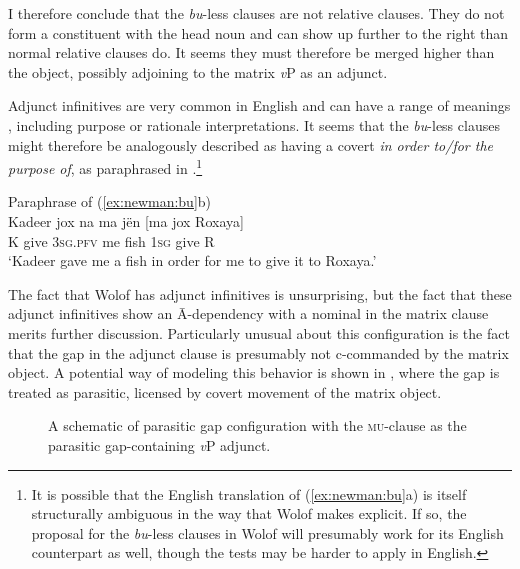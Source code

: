 \documentclass[output=paper]{langscibook}
\begin{document}
I therefore conclude that the \emph{bu}-less clauses are not relative clauses. They do not form a constituent with the head noun and can show up further to the right than normal relative clauses do. It seems they must therefore be merged higher than the object, possibly adjoining to the matrix \textit{v}P as an adjunct. 

Adjunct infinitives are very common in English and can have a range of meanings \citep{huettner:1989}, including purpose or rationale interpretations. It seems that the \emph{bu}-less clauses might therefore be analogously described as having a covert \emph{in order to/for the purpose of}, as paraphrased in .\footnote{It is possible that the English translation of (\ref{ex:newman:bu}a) is itself structurally ambiguous in the way that Wolof makes explicit. If so, the proposal for the \emph{bu}-less clauses in Wolof will presumably work for its English counterpart as well, though the tests may be harder to apply in English.}

\begin{exe}
	\ex \label{ex:newman:par} Paraphrase of (\ref{ex:newman:bu}b)\\
	\gll Kadeer jox na ma j\"en [ma jox Roxaya] \\
	K give \textsc{3sg.pfv} me fish \textsc{1sg} give R \\
	\trans `Kadeer gave me a fish in order for me to give it to Roxaya.'
\end{exe}

The fact that Wolof has adjunct infinitives is unsurprising, but the fact that these adjunct infinitives show an \={A}-dependency with a nominal in the matrix clause merits further discussion. Particularly unusual about this configuration is the fact that the gap in the adjunct clause is presumably not c-commanded by the matrix object. A potential way of modeling this behavior is shown in , where the gap is treated as parasitic, licensed by covert movement of the matrix object. 


\begin{figure} 
\caption{A schematic of  parasitic gap configuration with the \textsc{mu}-clause as the parasitic gap-containing \textit{v}P adjunct.} \label{fig:newman:10.3}
\end{figure}
\end{document}
